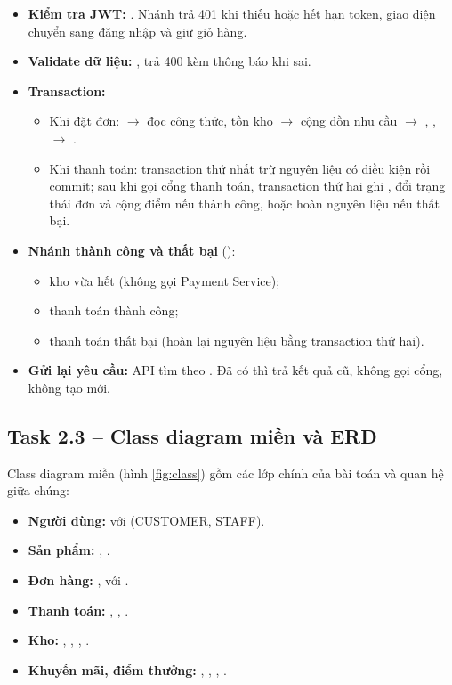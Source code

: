 \begin{itemize}
\item \textbf{Kiểm tra JWT:} . Nhánh  trả 401 khi thiếu hoặc hết hạn token, giao diện chuyển sang đăng nhập và giữ giỏ hàng.
\item \textbf{Validate dữ liệu:} , trả 400 kèm thông báo khi sai.
\item \textbf{Transaction:}
  \begin{itemize}
  \item Khi đặt đơn:  $\rightarrow$ đọc công thức, tồn kho $\rightarrow$ cộng dồn nhu cầu $\rightarrow$ , ,  $\rightarrow$ .
  \item Khi thanh toán: transaction thứ nhất trừ nguyên liệu có điều kiện rồi commit; sau khi gọi cổng thanh toán, transaction thứ hai ghi , đổi trạng thái đơn và cộng điểm nếu thành công, hoặc hoàn nguyên liệu nếu thất bại.
  \end{itemize}
\item \textbf{Nhánh thành công và thất bại} ():
  \begin{itemize}
  \item kho vừa hết (không gọi Payment Service);
  \item thanh toán thành công;
  \item thanh toán thất bại (hoàn lại nguyên liệu bằng transaction thứ hai).
  \end{itemize}
\item \textbf{Gửi lại yêu cầu:} API tìm  theo . Đã có thì trả kết quả cũ, không gọi cổng, không tạo  mới.
\end{itemize}


\subsection{Task 2.3 -- Class diagram miền và ERD}
Class diagram miền (hình \ref{fig:class}) gồm các lớp chính của bài toán và quan hệ giữa chúng:
\begin{itemize}
\item \textbf{Người dùng:}  với  (CUSTOMER, STAFF).
\item \textbf{Sản phẩm:} , .
\item \textbf{Đơn hàng:} ,  với .
\item \textbf{Thanh toán:} , , .
\item \textbf{Kho:} , , , .
\item \textbf{Khuyến mãi, điểm thưởng:} , , , .
\end{itemize}

